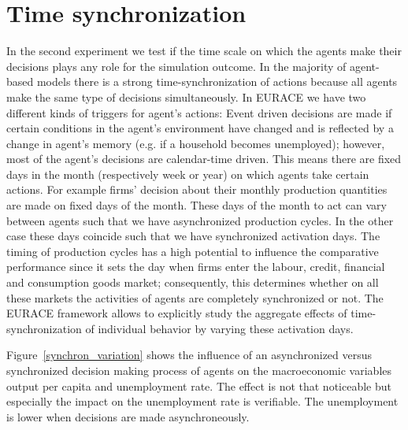 \section{Time synchronization}

In the second experiment we test if the time scale on which the agents make their decisions plays any role for the simulation outcome. In the majority of agent-based models there is a strong time-synchronization of actions because all agents make the same type of decisions simultaneously. In EURACE we have two different kinds of triggers for agent's actions: Event driven decisions are made if certain conditions in the agent's environment have changed and is reflected by a change in agent's memory (e.g. if a household becomes unemployed); however, most of the agent's decisions are calendar-time driven. This means there are fixed days in the month (respectively week or year) on which agents take certain actions. For example firms' decision about their monthly production quantities are made on fixed days of the month. These days of the month to act can vary between agents such that we have asynchronized production cycles. In the other case these days coincide such that we have synchronized activation days. The timing of production cycles has a high potential to influence the comparative performance since it sets the day when firms enter the labour, credit, financial and consumption goods market; consequently, this determines whether on all these markets the activities of agents are completely synchronized or not. The EURACE framework allows to explicitly study the aggregate effects of time-synchronization of individual behavior by varying these activation days.  

Figure~\ref{synchron_variation} shows the influence of an asynchronized versus synchronized decision making process of agents on the macroeconomic variables output per capita and unemployment rate. The effect is not that noticeable but especially the impact on the unemployment rate is verifiable. The unemployment is lower when decisions are made asynchroneously.

